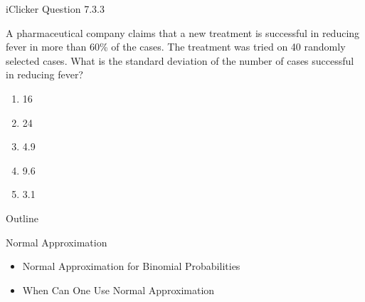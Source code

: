\documentclass[14pt]{beamer}\usepackage[]{graphicx}\usepackage[]{color}
\begin{document}
\begin{frame}[fragile]{iClicker Question 7.3.3}

A pharmaceutical company claims that a new treatment is successful in reducing fever in more than 60\% of the cases. The treatment was tried on 40 randomly selected cases. What is the standard deviation of the number of cases successful in reducing fever?

\begin{enumerate}[A]
\item 16
\item 24
\item 4.9
\item 9.6
\item 3.1
\end{enumerate}

\end{frame}

\begin{frame}[fragile]{Outline}

Normal Approximation  

\begin{itemize}
\item Normal Approximation for Binomial Probabilities 
\item When Can One Use Normal Approximation
\end{itemize}
\end{frame}
\end{document}
